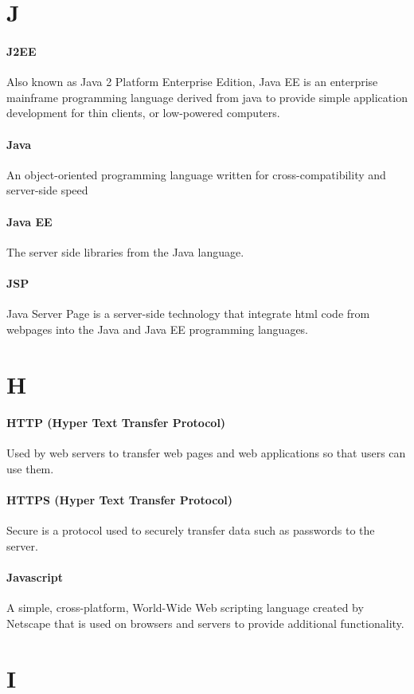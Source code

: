 \documentclass[letterpaper,12pt]{report}
\begin{document}
\section*{J}
\paragraph{J2EE} Also known as Java 2 Platform Enterprise Edition, Java EE is an enterprise mainframe programming language derived from java to provide simple application development for thin clients, or low-powered computers.
\paragraph{Java} An object-oriented programming language written for cross-compatibility and server-side speed
\paragraph{Java EE} The server side libraries from the Java language.
\paragraph{JSP} Java Server Page is a server-side technology that integrate html code from webpages into the Java and Java EE programming languages.
\section*{H}
\paragraph{HTTP (Hyper Text Transfer Protocol)} Used by web servers to transfer web pages and web applications so that users can use them.
\paragraph{HTTPS (Hyper Text Transfer Protocol)} Secure is a protocol used to securely transfer data such as passwords to the server. 
\paragraph{Javascript} A simple, cross-platform, World-Wide Web scripting language created by Netscape that is used on browsers and servers to provide additional functionality.
\section*{I}
\end{document}
